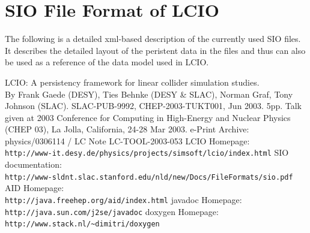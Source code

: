 \documentclass[twoside]{article}
\begin{document}
\newpage 
{}
\section{SIO File Format of LCIO} \label{app_lcio}

The following is a detailed xml-based description of the currently used SIO files.
It describes the  detailed layout of the peristent data in the files 
and thus can also be used as a reference of the data model used in LCIO.

{\footnotesize  }



%
\begin{thebibliography}{9}   %
 LCIO: A persistency framework for linear collider simulation studies. \\
{\footnotesize By Frank Gaede (DESY), Ties Behnke (DESY \& SLAC), Norman Graf, 
Tony Johnson (SLAC). SLAC-PUB-9992, CHEP-2003-TUKT001, Jun 2003. 5pp.
Talk given at 2003 Conference for Computing in High-Energy and Nuclear Physics (CHEP 03), 
La Jolla, California, 24-28 Mar 2003.
e-Print Archive: physics/0306114 / LC Note LC-TOOL-2003-053}
LCIO Homepage: \\
{\footnotesize \verb#http://www-it.desy.de/physics/projects/simsoft/lcio/index.html#}
SIO documentation: \\
{\footnotesize \verb#http://www-sldnt.slac.stanford.edu/nld/new/Docs/FileFormats/sio.pdf#}
AID Homepage: \\
{\footnotesize \verb#http://java.freehep.org/aid/index.html#}
javadoc Homepage: \\
{\footnotesize \verb#http://java.sun.com/j2se/javadoc#}
doxygen Homepage: \\
{\footnotesize \verb#http://www.stack.nl/~dimitri/doxygen#}
\end{thebibliography}
\end{document}
